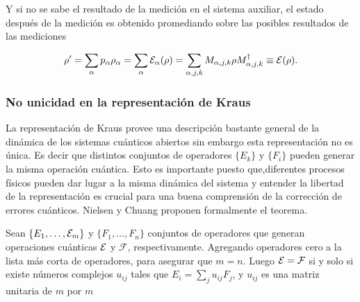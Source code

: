 Y si no se sabe el resultado de la medición en el sistema auxiliar, el estado después de la medición es obtenido promediando sobre las posibles resultados de las mediciones {\cite{unm2014}}

\begin{equation}
    \rho'=\sum_\alpha p_\alpha \rho_\alpha=\sum_\alpha \mathcal{E}_\alpha(\rho)=\sum_{\alpha,j,k} M_{\alpha,j,k}\rho M_{\alpha,j,k}^\dagger\equiv\mathcal{E}(\rho).
\end{equation}


\subsubsection{No unicidad en la representación de Kraus}
 La representación de Kraus provee una descripción bastante general de la dinámica de los sistemas cuánticos abiertos sin embargo esta representación no es única. Es decir que distintos conjuntos de operadores $\{E_k\}$ y $\{F_i\}$ pueden generar la misma operación cuántica. Esto es importante puesto que,diferentes procesos físicos pueden dar lugar a la misma dinámica del sistema y entender la libertad de la representación es crucial para una buena comprensión de la corrección de errores cuánticos. Nielsen y Chuang {\cite{nielsen_chuang_2010}} proponen formalmente el teorema.


 \begin{theorem}\label{Libertad_unitaria}Sean $\{E_1,\ldots,\mathcal{E}_m\}$ y $\{F_1,\ldots , F_n\}$ conjuntos de operadores que generan operaciones cuánticas $\mathcal{E}$ y $\mathcal{F}$, respectivamente. Agregando operadores cero a la lista más corta de operadores, para asegurar que $m=n$. Luego $\mathcal{E}=\mathcal{F}$ si y solo si existe números complejos $u_{ij}$ tales que $E_i=\sum_j u_{ij}F_j$, y $u_{ij}$ es una matriz unitaria de $m$ por $m$
    
 \end{theorem}


